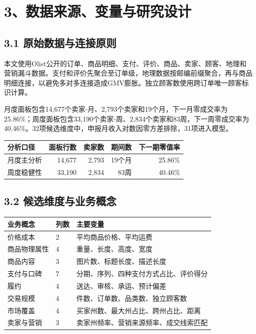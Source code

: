 \documentclass[UTF8,12pt,a4paper]{ctexart}
\begin{document}
\newpage
\section*{3、数据来源、变量与研究设计}

\subsection*{3.1 原始数据与连接原则}

本文使用Olist公开的订单、商品明细、支付、评价、商品、卖家、顾客、地理和营销漏斗数据。支付和评价先聚合至订单级，地理数据按邮编前缀聚合，再与商品明细连接，以避免多对多连接造成GMV膨胀。独立顾客数使用跨订单唯一顾客标识计算。

月度面板包含14,677个卖家-月、2,793个卖家和19个月，下一月零成交率为25.86\%；周度面板包含33,190个卖家-周、2,834个卖家和83周，下一周零成交率为40.46\%。32项候选维度中，申报月收入对数因零方差排除，31项进入模型。

\begin{center}
\small
\renewcommand{\arraystretch}{1.25}
\begin{tabular}{lrrrr}
\toprule
分析口径 & 面板行数 & 卖家数 & 期间数 & 下一期零值率\\
\midrule
月度主分析 & 14,677 & 2,793 & 19个月 & 25.86\%\\
周度稳健性 & 33,190 & 2,834 & 83周 & 40.46\%\\
\bottomrule
\end{tabular}
\end{center}

\subsection*{3.2 候选维度与业务概念}

\begin{center}
\footnotesize
\renewcommand{\arraystretch}{1.18}
\begin{tabularx}{0.98\textwidth}{p{2.5cm}p{1.2cm}Y}
\toprule
业务概念 & 列数 & 主要变量\\
\midrule
价格成本 & 2 & 平均商品价格、平均运费\\
商品物理属性 & 4 & 重量、长度、高度、宽度\\
商品内容 & 3 & 图片数、标题长度、描述长度\\
支付与口碑 & 7 & 分期、序列、四种支付方式占比、评价得分\\
履约 & 4 & 送达、审核、承运、预计偏差\\
交易规模 & 4 & 件数、订单数、品类数、独立顾客数\\
市场覆盖 & 4 & 买家州数、最大州占比、跨州占比、距离\\
卖家与营销 & 3 & 卖家州频率、营销来源频率、成交线索匹配\\
\bottomrule
\end{tabularx}
\end{center}
\end{document}
